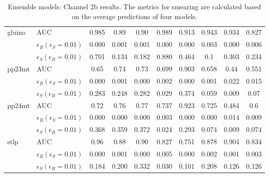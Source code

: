 \begin{table}[H]
\begin{tabular}{ll|ccc|cc|ccc}
    \hline  
    \multirow{3}{*}{gluino} & AUC & 0.985 & 0.89 & 0.90 & 0.989 & 0.913 & 0.943 & 0.934 & 0.827 \\
    & $\epsilon_B(\epsilon_S=0.01)$ & 0.000 & 0.001 & 0.001 & 0.000 & 0.000 & 0.003 & 0.000 & 0.006 \\
    & $\epsilon_S(\epsilon_B=0.01)$ & 0.701 & 0.134 & 0.182 & 0.880 & 0.464 & 0.1 & 0.303 & 0.234 \\
    \hline  
    \multirow{3}{*}{pp23mt} & AUC & 0.65 & 0.74 & 0.73 & 0.699 & 0.903 & 0.658 & 0.44 & 0.551 \\
    & $\epsilon_B(\epsilon_S=0.01)$ & 0.000 & 0.001 & 0.000 & 0.002 & 0.000 & 0.001 & 0.022 & 0.015 \\
    & $\epsilon_S(\epsilon_B=0.01)$ & 0.283 & 0.248 & 0.282 & 0.029 & 0.374 & 0.059 & 0.009 & 0.07 \\
    \hline  
    \multirow{3}{*}{pp24mt} & AUC & 0.72 & 0.76 & 0.77 & 0.737 & 0.923 & 0.725 & 0.484 & 0.6 \\
    & $\epsilon_B(\epsilon_S=0.01)$ & 0.000 & 0.000 & 0.000 & 0.003 & 0.000 & 0.000 & 0.014 & 0.009 \\
    & $\epsilon_S(\epsilon_B=0.01)$ & 0.368 & 0.359 & 0.372 & 0.024 & 0.293 & 0.074 & 0.009 & 0.074 \\
    \hline  
    \multirow{3}{*}{stlp} & AUC & 0.96 & 0.88 & 0.90 & 0.827 & 0.751 & 0.878 & 0.904 & 0.834 \\
    & $\epsilon_B(\epsilon_S=0.01)$ & 0.000 & 0.001 & 0.000 & 0.005 & 0.000 & 0.002 & 0.001 & 0.003 \\
    & $\epsilon_S(\epsilon_B=0.01)$ & 0.184 & 0.200 & 0.332 & 0.030 & 0.101 & 0.208 & 0.126 & 0.126 \\
    \hline   
    \end{tabular}
    \caption{Ensemble models: Channel 2b results. The metrics for smearing are calculated based on the average predictions of four models.}
    \label{tab:ch2b_all}
    \end{table}
    